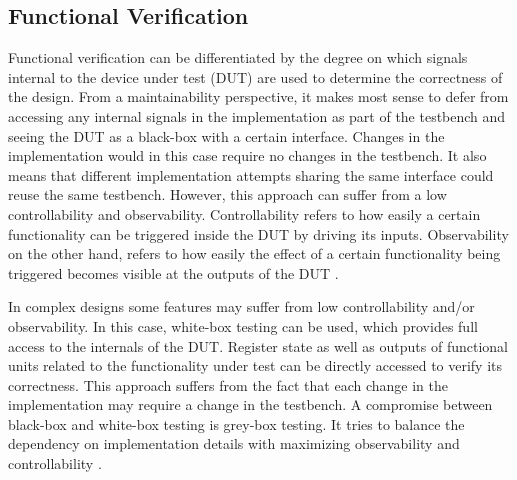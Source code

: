 \subsection{Functional Verification} %


Functional verification can be differentiated by the degree on which signals internal to the device under
test (DUT) are used to determine the correctness of the design. From a maintainability perspective, it makes
most sense to defer from accessing any internal signals in the implementation as part of the testbench and seeing the
DUT as a black-box with a certain interface. Changes in the implementation would in this case require no changes in
the testbench. It also means that different implementation attempts sharing the same interface could reuse the same
testbench. However, this approach can suffer from a low controllability and observability. Controllability refers to
how easily a certain functionality can be triggered inside the DUT by driving its inputs. Observability on the other
hand, refers to how easily the effect of a certain functionality being triggered becomes visible at the outputs of
the DUT \cite[Ch. 1]{bergeron2012writing}.

In complex designs some features may suffer from low controllability and/or observability. In this case, white-box
testing can be used, which provides full access to the internals of the DUT. Register state as well as outputs of
functional units related to the functionality under test can be directly accessed to verify its correctness. This
approach suffers from the fact that each change in the implementation may require a change in the testbench. A
compromise between black-box and white-box testing is grey-box testing. It tries to balance the dependency on
implementation details with maximizing observability and controllability \cite[Ch. 1]{bergeron2012writing}.

